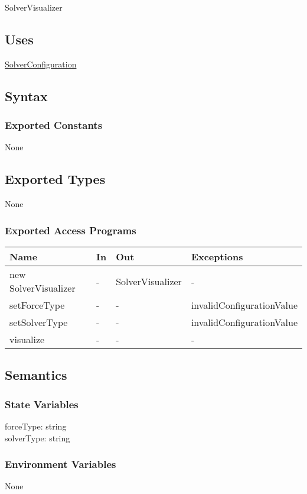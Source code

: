 \documentclass[12pt, titlepage]{article}
\begin{document}
SolverVisualizer

\subsection{Uses}
\hyperref[SolverConfiguration]{SolverConfiguration}

\subsection{Syntax}

\subsubsection{Exported Constants}
None
\subsection{Exported Types}
None

\subsubsection{Exported Access Programs}
\begin{center}
\begin{tabular}{p{5cm} p{2cm} p{4cm} p{5.5cm}}
\hline
\textbf{Name} & \textbf{In} & \textbf{Out} & \textbf{Exceptions} \\
\hline
new SolverVisualizer & - & SolverVisualizer & - \\
\hline
setForceType & - & - & invalidConfigurationValue \\
\hline
setSolverType & - & - & invalidConfigurationValue\\
\hline
visualize & - & - & - \\
\hline
\end{tabular}
\end{center}

\subsection{Semantics}

\subsubsection{State Variables}
forceType: string\\
solverType: string
\subsubsection{Environment Variables}
None
\end{document}

